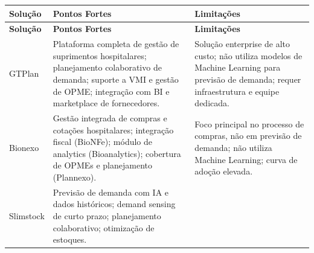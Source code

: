 \documentclass[12pt,a4paper]{article}
\begin{document}
\begin{longtable}{p{} p{} p{}}
    \toprule
    \textbf{Solução}                                                                                                                                                                                     & \textbf{Pontos Fortes} & \textbf{Limitações} \\
    \midrule
    \endfirsthead
    \toprule
    \textbf{Solução}                                                                                                                                                                                     & \textbf{Pontos Fortes} & \textbf{Limitações} \\
    \midrule
    \endhead
    GTPlan                                                                                                                                                                                               &
    Plataforma completa de gestão de suprimentos hospitalares; planejamento colaborativo de demanda; suporte a VMI e gestão de OPME; integração com BI e marketplace de fornecedores.                    &
    Solução enterprise de alto custo; não utiliza modelos de Machine Learning para previsão de demanda; requer infraestrutura e equipe dedicada.                                                                                                        \\
    \midrule
    Bionexo                                                                                                                                                                                              &
    Gestão integrada de compras e cotações hospitalares; integração fiscal (BioNFe); módulo de analytics (Bioanalytics); cobertura de OPMEs e planejamento (Plannexo).                                   &
    Foco principal no processo de compras, não em previsão de demanda; não utiliza Machine Learning; curva de adoção elevada.                                                                                                                           \\
    \midrule
    Slimstock                                                                                                                                                                                            &
    Previsão de demanda com IA e dados históricos; demand sensing de curto prazo; planejamento colaborativo; otimização de estoques.                                                                     &

\end{longtable}
\end{document}
